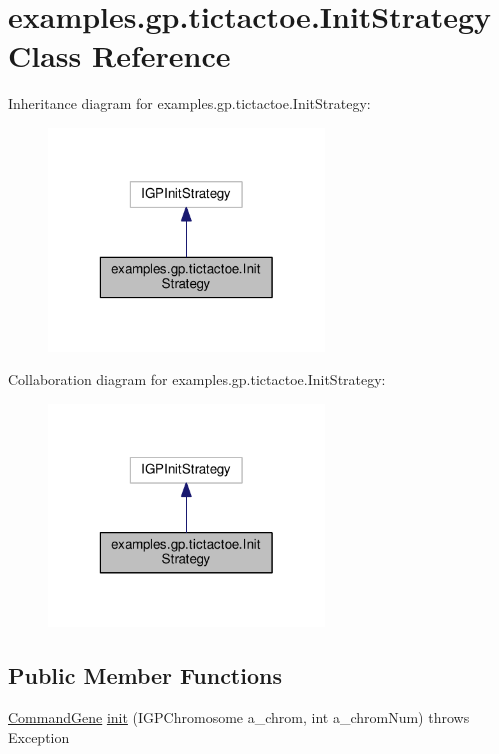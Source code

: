 \hypertarget{classexamples_1_1gp_1_1tictactoe_1_1_init_strategy}{\section{examples.\-gp.\-tictactoe.\-Init\-Strategy Class Reference}
\label{classexamples_1_1gp_1_1tictactoe_1_1_init_strategy}
}


Inheritance diagram for examples.\-gp.\-tictactoe.\-Init\-Strategy\-:
\nopagebreak
\begin{figure}[H]
\begin{center}
\leavevmode
\includegraphics[width=208pt]{classexamples_1_1gp_1_1tictactoe_1_1_init_strategy__inherit__graph}
\end{center}
\end{figure}


Collaboration diagram for examples.\-gp.\-tictactoe.\-Init\-Strategy\-:
\nopagebreak
\begin{figure}[H]
\begin{center}
\leavevmode
\includegraphics[width=208pt]{classexamples_1_1gp_1_1tictactoe_1_1_init_strategy__coll__graph}
\end{center}
\end{figure}
\subsection*{Public Member Functions}
\begin{DoxyCompactItemize}
\item 
\hyperlink{classorg_1_1jgap_1_1gp_1_1_command_gene}{Command\-Gene} \hyperlink{classexamples_1_1gp_1_1tictactoe_1_1_init_strategy_a808dfe8da6f525aa64555ffb7f34f4fb}{init} (I\-G\-P\-Chromosome a\-\_\-chrom, int a\-\_\-chrom\-Num)  throws Exception 
\end{DoxyCompactItemize}
